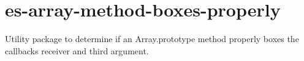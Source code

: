 \chapter{es-\/array-\/method-\/boxes-\/properly}
\hypertarget{md_pkiclassroomrescheduler_2src_2main_2frontend_2node__modules_2es-array-method-boxes-properly_2_r_e_a_d_m_e}{}\label{md_pkiclassroomrescheduler_2src_2main_2frontend_2node__modules_2es-array-method-boxes-properly_2_r_e_a_d_m_e}
\label{md_pkiclassroomrescheduler_2src_2main_2frontend_2node__modules_2es-array-method-boxes-properly_2_r_e_a_d_m_e_autotoc_md9060}%
%
 Utility package to determine if an {\ttfamily Array.\+prototype} method properly boxes the callback\textquotesingle{}s receiver and third argument. 